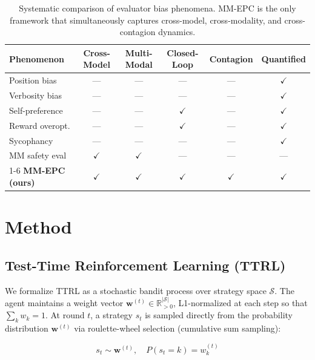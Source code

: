 \documentclass[11pt,a4paper]{article}
\begin{document}
\begin{table}[H]
\centering
\caption{Systematic comparison of evaluator bias phenomena. MM-EPC is the only framework that simultaneously captures cross-model, cross-modality, and cross-contagion dynamics.}
\label{tab:related}
\begin{tabular}{lccccc}
\toprule
\textbf{Phenomenon} & \textbf{Cross-Model} & \textbf{Multi-Modal} & \textbf{Closed-Loop} & \textbf{Contagion} & \textbf{Quantified} \\
\midrule
Position bias \cite{zheng2023judging}      & --- & --- & --- & --- & $\checkmark$ \\
Verbosity bias \cite{li2024alpacaeval}     & --- & --- & --- & --- & $\checkmark$ \\
Self-preference \cite{yuan2024selfrewarding} & --- & --- & $\checkmark$ & --- & $\checkmark$ \\
Reward overopt. \cite{gao2023reward}       & --- & --- & $\checkmark$ & --- & $\checkmark$ \\
Sycophancy \cite{sharma2024sycophancy}     & --- & --- & --- & --- & $\checkmark$ \\
MM safety eval \cite{openai2024gpt4o}      & $\checkmark$ & $\checkmark$ & --- & --- & --- \\
\cmidrule{1-6}
\textbf{MM-EPC (ours)} & $\checkmark$ & $\checkmark$ & $\checkmark$ & $\checkmark$ & $\checkmark$ \\
\bottomrule
\end{tabular}
\end{table}

\section{Method}

\subsection{Test-Time Reinforcement Learning (TTRL)}

We formalize TTRL as a stochastic bandit process over strategy space $\mathcal{S}$. The agent maintains a weight vector $\mathbf{w}^{(t)} \in \mathbb{R}^{|\mathcal{S}|}_{>0}$, L1-normalized at each step so that $\sum_k w_k = 1$. At round $t$, a strategy $s_t$ is sampled directly from the probability distribution $\mathbf{w}^{(t)}$ via roulette-wheel selection (cumulative sum sampling):

\begin{equation}
s_t \sim \mathbf{w}^{(t)}, \quad P(s_t = k) = w_k^{(t)}
\end{equation}
\end{document}
